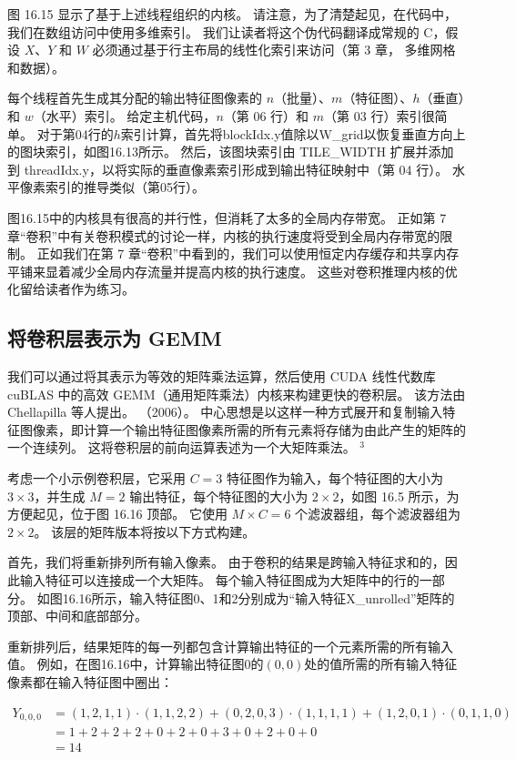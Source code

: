 图 16.15 显示了基于上述线程组织的内核。 请注意，为了清楚起见，在代码中，我们在数组访问中使用多维索引。 我们让读者将这个伪代码翻译成常规的 $\mathrm{C}$，假设 $X、Y$ 和 $W$ 必须通过基于行主布局的线性化索引来访问（第 3 章， 多维网格和数据）。

每个线程首先生成其分配的输出特征图像素的 $n$（批量）、$m$（特征图）、$h$（垂直）和 $w$（水平）索引。 给定主机代码，$n$（第 06 行）和 $m$（第 03 行）索引很简单。 对于第04行的$h$索引计算，首先将blockIdx.y值除以W\_grid以恢复垂直方向上的图块索引，如图16.13所示。 然后，该图块索引由 TILE\_WIDTH 扩展并添加到 threadIdx.y，以将实际的垂直像素索引形成到输出特征映射中（第 04 行）。 水平像素索引的推导类似（第05行）。

图16.15中的内核具有很高的并行性，但消耗了太多的全局内存带宽。 正如第 7 章“卷积”中有关卷积模式的讨论一样，内核的执行速度将受到全局内存带宽的限制。 正如我们在第 7 章“卷积”中看到的，我们可以使用恒定内存缓存和共享内存平铺来显着减少全局内存流量并提高内核的执行速度。 这些对卷积推理内核的优化留给读者作为练习。

\subsection{将卷积层表示为 GEMM}
我们可以通过将其表示为等效的矩阵乘法运算，然后使用 CUDA 线性代数库 cuBLAS 中的高效 GEMM（通用矩阵乘法）内核来构建更快的卷积层。 该方法由 Chellapilla 等人提出。 （2006）。 中心思想是以这样一种方式展开和复制输入特征图像素，即计算一个输出特征图像素所需的所有元素将存储为由此产生的矩阵的一个连续列。 这将卷积层的前向运算表述为一个大矩阵乘法。 ${}^{3}$

考虑一个小示例卷积层，它采用 $C=3$ 特征图作为输入，每个特征图的大小为 $3 \times 3$，并生成 $M=2$ 输出特征，每个特征图的大小为 $2 \times 2 $，如图 16.5 所示，为方便起见，位于图 16.16 顶部。 它使用 $M \times C=6$ 个滤波器组，每个滤波器组为 $2 \times 2$。 该层的矩阵版本将按以下方式构建。

首先，我们将重新排列所有输入像素。 由于卷积的结果是跨输入特征求和的，因此输入特征可以连接成一个大矩阵。 每个输入特征图成为大矩阵中的行的一部分。 如图16.16所示，输入特征图0、1和2分别成为“输入特征X\_unrolled”矩阵的顶部、中间和底部部分。

重新排列后，结果矩阵的每一列都包含计算输出特征的一个元素所需的所有输入值。 例如，在图16.16中，计算输出特征图0的$(0,0)$处的值所需的所有输入特征像素都在输入特征图中圈出：

$$
\begin{aligned}
Y_{0,0,0} & =(1,2,1,1) \cdot(1,1,2,2)+(0,2,0,3) \cdot(1,1,1,1 )+(1,2,0,1) \cdot(0,1,1,0) \\
& =1+2+2+2+0+2+0+3+0+2+0+0 \\
&=14
\end{aligned}
$$

